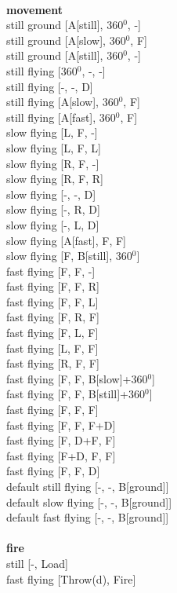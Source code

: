\ \\ {\bf movement } \\
still ground [A[still], 360$^0$, -] \\
still ground [A[slow], 360$^0$, F] \\
still ground [A[still], 360$^0$, -] \\
still flying [360$^0$, -, -] \\
still flying [-, -, D] \\
still flying [A[slow], 360$^0$, F] \\
still flying [A[fast], 360$^0$, F] \\
slow flying [L, F, -] \\
slow flying [L, F, L] \\
slow flying [R, F, -] \\
slow flying [R, F, R] \\
slow flying [-, -, D] \\
slow flying [-, R, D] \\
slow flying [-, L, D] \\
slow flying [A[fast], F, F] \\
slow flying [F, B[still], 360$^0$] \\
fast flying [F, F, -] \\
fast flying [F, F, R] \\
fast flying [F, F, L] \\
fast flying [F, R, F] \\
fast flying [F, L, F] \\
fast flying [L, F, F] \\
fast flying [R, F, F] \\
fast flying [F, F, B[slow]+360$^0$] \\
fast flying [F, F, B[still]+360$^0$] \\
fast flying [F, F, F] \\
fast flying [F, F, F+D] \\
fast flying [F, D+F, F] \\
fast flying [F+D, F, F] \\
fast flying [F, F, D] \\
default still flying [-, -, B[ground]] \\
default slow flying [-, -, B[ground]] \\
default fast flying [-, -, B[ground]] \\
\ \\ {\bf fire } \\
still [-, Load] \\
fast flying [Throw(d), Fire] \\
